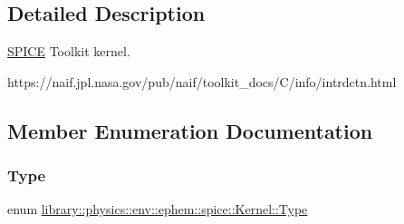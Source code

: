 \subsection{Detailed Description}
\hyperlink{classlibrary_1_1physics_1_1env_1_1ephem_1_1_s_p_i_c_e}{S\+P\+I\+CE} Toolkit kernel. 

https\+://naif.jpl.\+nasa.\+gov/pub/naif/toolkit\+\_\+docs/\+C/info/intrdctn.html 

\subsection{Member Enumeration Documentation}
\mbox{\label{classlibrary_1_1physics_1_1env_1_1ephem_1_1spice_1_1_kernel_ab28fd08b98057f635ee6a0e75b59fae6}} 
\subsubsection{\texorpdfstring{Type}{Type}}
{\footnotesize\ttfamily enum \hyperlink{classlibrary_1_1physics_1_1env_1_1ephem_1_1spice_1_1_kernel_ab28fd08b98057f635ee6a0e75b59fae6}{library\+::physics\+::env\+::ephem\+::spice\+::\+Kernel\+::\+Type}\hspace{0.3cm}{\ttfamily [strong]}}

